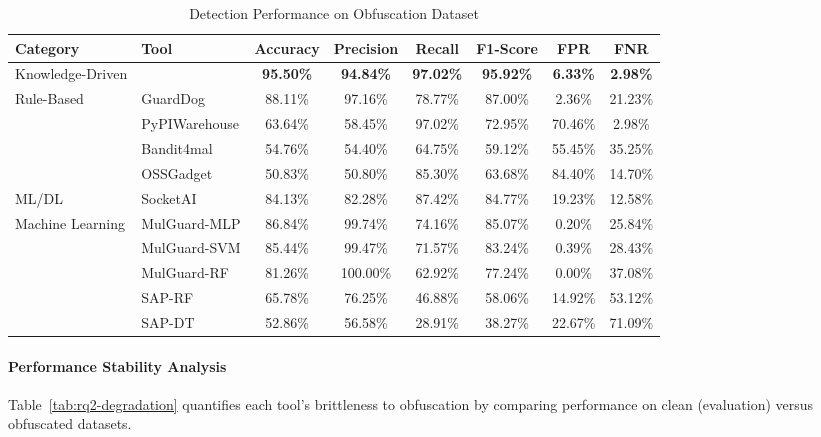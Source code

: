 \begin{table}[t]
\centering
\caption{Detection Performance on Obfuscation Dataset}
\label{tab:rq2-obfuscation-performance}
\small
\begin{tabular}{llcccccc}
\toprule
\textbf{Category} & \textbf{Tool} & \textbf{Accuracy} & \textbf{Precision} & \textbf{Recall} & \textbf{F1-Score} & \textbf{FPR} & \textbf{FNR} \\
\midrule
\multirow{1}{*}{Knowledge-Driven} & \textbf{\tool{}} & \textbf{95.50\%} & \textbf{94.84\%} & \textbf{97.02\%} & \textbf{95.92\%} & \textbf{6.33\%} & \textbf{2.98\%} \\
\midrule
\multirow{4}{*}{Rule-Based} 
& GuardDog & 88.11\% & 97.16\% & 78.77\% & 87.00\% & 2.36\% & 21.23\% \\
& PyPIWarehouse & 63.64\% & 58.45\% & 97.02\% & 72.95\% & 70.46\% & 2.98\% \\
& Bandit4mal & 54.76\% & 54.40\% & 64.75\% & 59.12\% & 55.45\% & 35.25\% \\
& OSSGadget & 50.83\% & 50.80\% & 85.30\% & 63.68\% & 84.40\% & 14.70\% \\
\midrule
ML/DL & SocketAI & 84.13\% & 82.28\% & 87.42\% & 84.77\% & 19.23\% & 12.58\% \\
\midrule
\multirow{5}{*}{Machine Learning}
& MulGuard-MLP & 86.84\% & 99.74\% & 74.16\% & 85.07\% & 0.20\% & 25.84\% \\
& MulGuard-SVM & 85.44\% & 99.47\% & 71.57\% & 83.24\% & 0.39\% & 28.43\% \\
& MulGuard-RF & 81.26\% & 100.00\% & 62.92\% & 77.24\% & 0.00\% & 37.08\% \\
& SAP-RF & 65.78\% & 76.25\% & 46.88\% & 58.06\% & 14.92\% & 53.12\% \\
& SAP-DT & 52.86\% & 56.58\% & 28.91\% & 38.27\% & 22.67\% & 71.09\% \\
\bottomrule
\end{tabular}
\end{table}

\paragraph{Performance Stability Analysis}

Table~\ref{tab:rq2-degradation} quantifies each tool's brittleness to obfuscation by comparing performance on clean (evaluation) versus obfuscated datasets.

